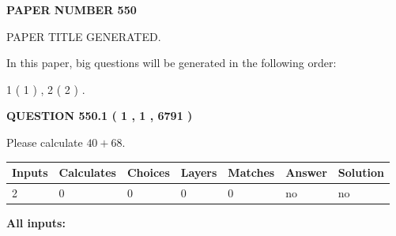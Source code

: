 \documentclass[12pt]{article}
\begin{document}
   
   
   
\newpage 
\setcounter{page}{ 
   550001 } 
   
   
   
   
 {\textbf{ \Large{ PAPER NUMBER  550  }}}
   
   
\vspace{0.2in}
   
   
   
   
   
   
   
   
 \vspace{0.2in}
 
 
 
 
   
   
 PAPER TITLE GENERATED.
   
   
   
\vspace{0.2in}
   
In this paper, big questions will be generated in the following order: 
   
   
   1 ( 1 )
 ,
   2 ( 2 )
 .
  
\vspace{0.2in}
  
{\textbf{\Large{QUESTION
550.1 
 ( 1 , 1 , 6791 )
}}}
  
  
 
Please calculate $ %
40 +  %
68 $.
 
 
   
   
   
   
\noindent\begin{tabular}{|l|l|l|l|l|l|l|}
 \hline
Inputs & Calculates & Choices & Layers & Matches & Answer & Solution \\ \hline
 2  & 
 0  & 
 0
  & 
 0  & 
 0  & 
  no & 
  no 
  \\ \hline
 \end{tabular}
   
   
   
   
\noindent{}
   
   
   
   
\noindent\vspace{0.1in}\hspace{-0.08in} {\textbf{\Large{All inputs: }}}
   
   
  
\end{document}
